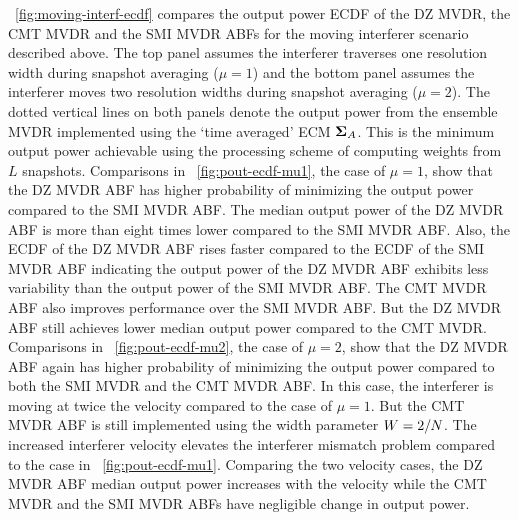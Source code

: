\figurename{}~\ref{fig:moving-interf-ecdf} compares the output power
ECDF of the DZ MVDR, the CMT MVDR and the SMI MVDR ABFs for the moving
interferer scenario described above. The top panel assumes the
interferer traverses one resolution width during snapshot averaging
($\mu = 1$) and the bottom panel assumes the interferer moves two
resolution widths during snapshot averaging ($\mu = 2$). The dotted
vertical lines on both panels denote the output power from the
ensemble MVDR implemented using the `time averaged' ECM $\boldsymbol{\Sigma}_A$. This is the minimum output power achievable using the processing scheme of computing weights from $L$ snapshots. Comparisons
in \figurename{}~\ref{fig:pout-ecdf-mu1}, the case of $\mu = 1$, show
that the DZ MVDR ABF has higher probability of minimizing the output
power compared to the SMI MVDR ABF. The median output power of the DZ
MVDR ABF is more than eight times lower compared to the SMI MVDR ABF.
Also, the ECDF of the DZ MVDR ABF rises faster compared to the ECDF of
the SMI MVDR ABF indicating the output power of the DZ MVDR ABF
exhibits less variability than the output power of the SMI MVDR
ABF. The CMT MVDR ABF also improves performance over the SMI MVDR
ABF. But the DZ MVDR ABF still achieves lower median output power
compared to the CMT MVDR.
\clearpage
Comparisons in \figurename{}~\ref{fig:pout-ecdf-mu2}, the case of
$\mu = 2$, show that the DZ MVDR ABF again has higher probability of
minimizing the output power compared to both the SMI MVDR and the CMT
MVDR ABF. In this case, the interferer is moving at twice the velocity
compared to the case of $\mu = 1$. But the CMT MVDR ABF is still
implemented using the width parameter $W = 2/N$. The increased
interferer velocity elevates the interferer mismatch problem compared
to the case in \figurename{}~\ref{fig:pout-ecdf-mu1}. Comparing the
two velocity cases, the DZ MVDR ABF median output power increases with
the velocity while the CMT MVDR and the SMI MVDR ABFs have negligible
change in output power.

